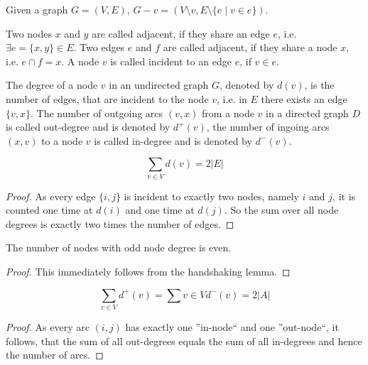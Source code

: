 \begin{definition}
Given a graph $G = (V, E)$, $G - v = (V \setminus v, E \setminus \{e \mid v \in e\})$.
\end{definition}

\begin{definition}
Two nodes $x$ and $y$ are called adjacent, if they share an edge $e$, i.e. $\exists e = \{x, y\} \in E$. Two edges $e$ and $f$ are called adjacent, if they share a node $x$, i.e. $e \cap f = x$. A node $v$ is called incident to an edge $e$, if $v \in e$.
\end{definition}

\begin{definition}
The degree of a node $v$ in an undirected graph $G$, denoted by $d(v)$, is the number of edges, that are incident to the node $v$, i.e. in $E$ there exists an edge $\{v, x\}$. The number of outgoing arcs $(v, x)$ from a node $v$ in a directed graph $D$ is called out-degree and is denoted by $d^+(v)$, the number of ingoing arcs $(x, v)$ to a node $v$ is called in-degree and is denoted by $d^-(v)$.
\end{definition}

\begin{lemma}
$$\sum_{v \in V}d(v) = 2\left\vert{E}\right\vert$$
\end{lemma}
\begin{proof}
As every edge $\{i, j\}$ is incident to exactly two nodes, namely $i$ and $j$, it is
counted one time at $d(i)$ and one time at $d(j)$. So the sum over all node degrees
is exactly two times the number of edges.
\end{proof}

\begin{corollary}
The number of nodes with odd node degree is even.
\end{corollary}
\begin{proof}
This immediately follows from the handshaking lemma.
\end{proof}

\begin{lemma}
$$\sum_{v\in V}d^+(v)=\sum{v\in V}d^-(v)=2\left\vert{A}\right\vert$$
\end{lemma}
\begin{proof}
As every arc $(i, j)$ has exactly one ”in-node“ and one ”out-node“, it follows,
that the sum of all out-degrees equals the sum of all in-degrees and hence the
number of arcs.
\end{proof}


